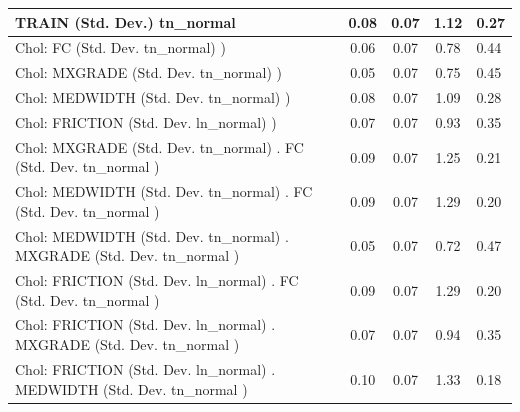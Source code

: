 \begin{table}
\begin{center}
\begin{tabular}{|l|l|c|c|c|l|}
			\hline
			TRAIN (Std. Dev.) tn_normal &  & 0.08 & 0.07 & 1.12 & 0.27 \\
			\hline
			 Chol: FC (Std. Dev. tn_normal) ) &  & 0.06 & 0.07 & 0.78 & 0.44 \\
			\hline
			 Chol: MXGRADE (Std. Dev. tn_normal) ) &  & 0.05 & 0.07 & 0.75 & 0.45 \\
			\hline
			 Chol: MEDWIDTH (Std. Dev. tn_normal) ) &  & 0.08 & 0.07 & 1.09 & 0.28 \\
			\hline
			 Chol: FRICTION (Std. Dev. ln_normal) ) &  & 0.07 & 0.07 & 0.93 & 0.35 \\
			\hline
			 Chol: MXGRADE (Std. Dev. tn_normal) . FC (Std. Dev.   tn_normal ) &  & 0.09 & 0.07 & 1.25 & 0.21 \\
			\hline
			 Chol: MEDWIDTH (Std. Dev. tn_normal) . FC (Std. Dev.   tn_normal ) &  & 0.09 & 0.07 & 1.29 & 0.20 \\
			\hline
			 Chol: MEDWIDTH (Std. Dev. tn_normal) . MXGRADE (Std. Dev.   tn_normal ) &  & 0.05 & 0.07 & 0.72 & 0.47 \\
			\hline
			 Chol: FRICTION (Std. Dev. ln_normal) . FC (Std. Dev.   tn_normal ) &  & 0.09 & 0.07 & 1.29 & 0.20 \\
			\hline
			 Chol: FRICTION (Std. Dev. ln_normal) . MXGRADE (Std. Dev.   tn_normal ) &  & 0.07 & 0.07 & 0.94 & 0.35 \\
			\hline
			 Chol: FRICTION (Std. Dev. ln_normal) . MEDWIDTH (Std. Dev.   tn_normal ) &  & 0.10 & 0.07 & 1.33 & 0.18 \\
			\hline
		\end{tabular}
	\end{center}
\end{table}
